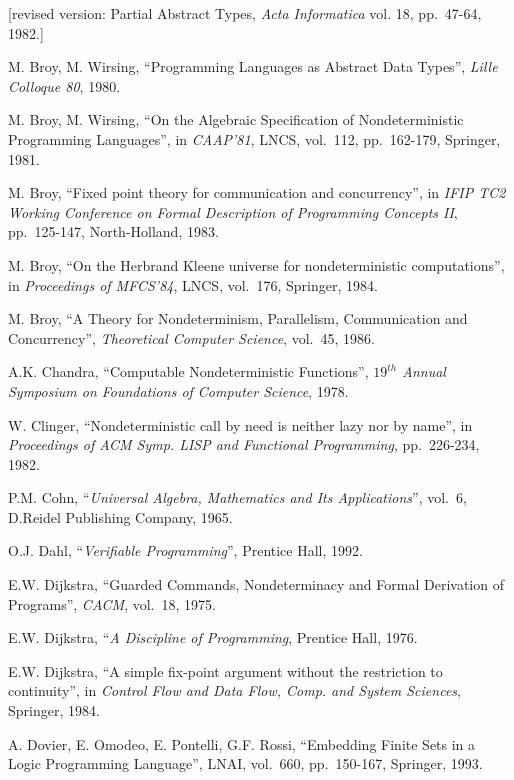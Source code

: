 {\small{[revised version: 
Partial Abstract Types, {\em Acta Informatica\/} vol. 18, pp.~47-64, 1982.]}\normalsize}

 M. Broy, M. Wirsing, ``Programming Languages as Abstract 
Data Types'', {\em Lille Colloque 80}, 1980.

 M. Broy, M. Wirsing, ``On the Algebraic Specification of 
Nondeterministic Programming Languages'', in {\em CAAP'81}, LNCS,
vol.~112, pp.~162-179, Springer, 1981.

 M. Broy, ``Fixed point theory for communication and 
concurrency'', in {\em IFIP TC2 Working Conference on Formal Description of 
Programming Concepts II}, pp.~125-147, North-Holland, 1983.

 M. Broy, ``On the Herbrand Kleene universe for 
nondeterministic computations'', in {\em Proceedings of MFCS'84}, LNCS, 
vol.~176, Springer, 1984.

 M. Broy, ``A Theory for Nondeterminism, Parallelism, 
Communication and Concurrency'', {\em Theoretical Computer Science}, 
vol.~45, 1986.

 A.K. Chandra, ``Computable Nondeterministic Functions'', 
{\em $19^{th}$ Annual Symposium on Foundations of Computer Science}, 1978.

 W. Clinger, ``Nondeterministic call by need is neither 
lazy nor by name'', in {\em Proceedings of ACM Symp.  LISP and Functional 
Programming}, pp.~226-234, 1982.

 P.M. Cohn, ``{\em Universal Algebra, Mathematics and Its 
Applications}'', vol.~6, D.Reidel Publishing Company, 1965.

 O.J. Dahl, ``{\em Verifiable Programming}'', Prentice 
Hall, 1992.

 E.W. Dijkstra, ``Guarded Commands, Nondeterminacy and 
Formal Derivation of Programs'', {\em CACM}, vol.~18, 1975.

 E.W. Dijkstra, ``{\em A Discipline of Programming}, 
Prentice Hall, 1976.

 E.W. Dijkstra, ``A simple fix-point argument without the 
restriction to continuity'', in {\em Control Flow and Data Flow, Comp.  and 
System Sciences}, Springer, 1984.

 A. Dovier, E. Omodeo, E. Pontelli, G.F. Rossi, 
``Embedding Finite Sets in a Logic Programming Language'', LNAI, vol.~660, 
 pp.~150-167, Springer, 1993.

